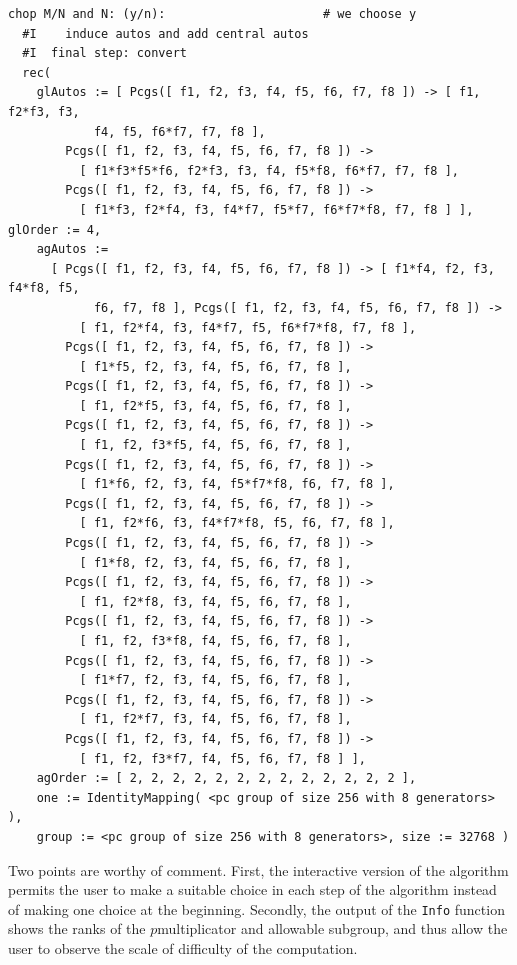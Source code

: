 \documentclass[a4paper,11pt]{report}
\begin{document}
{{\begin{Verbatim}[commandchars=!@|,fontsize=\small,frame=single,label=Example]
  chop M/N and N: (y/n):                      # we choose y
  #I    induce autos and add central autos
  #I  final step: convert
  rec(
    glAutos := [ Pcgs([ f1, f2, f3, f4, f5, f6, f7, f8 ]) -> [ f1, f2*f3, f3,
            f4, f5, f6*f7, f7, f8 ],
        Pcgs([ f1, f2, f3, f4, f5, f6, f7, f8 ]) ->
          [ f1*f3*f5*f6, f2*f3, f3, f4, f5*f8, f6*f7, f7, f8 ],
        Pcgs([ f1, f2, f3, f4, f5, f6, f7, f8 ]) ->
          [ f1*f3, f2*f4, f3, f4*f7, f5*f7, f6*f7*f8, f7, f8 ] ], glOrder := 4,
    agAutos :=
      [ Pcgs([ f1, f2, f3, f4, f5, f6, f7, f8 ]) -> [ f1*f4, f2, f3, f4*f8, f5,
            f6, f7, f8 ], Pcgs([ f1, f2, f3, f4, f5, f6, f7, f8 ]) ->
          [ f1, f2*f4, f3, f4*f7, f5, f6*f7*f8, f7, f8 ],
        Pcgs([ f1, f2, f3, f4, f5, f6, f7, f8 ]) ->
          [ f1*f5, f2, f3, f4, f5, f6, f7, f8 ],
        Pcgs([ f1, f2, f3, f4, f5, f6, f7, f8 ]) ->
          [ f1, f2*f5, f3, f4, f5, f6, f7, f8 ],
        Pcgs([ f1, f2, f3, f4, f5, f6, f7, f8 ]) ->
          [ f1, f2, f3*f5, f4, f5, f6, f7, f8 ],
        Pcgs([ f1, f2, f3, f4, f5, f6, f7, f8 ]) ->
          [ f1*f6, f2, f3, f4, f5*f7*f8, f6, f7, f8 ],
        Pcgs([ f1, f2, f3, f4, f5, f6, f7, f8 ]) ->
          [ f1, f2*f6, f3, f4*f7*f8, f5, f6, f7, f8 ],
        Pcgs([ f1, f2, f3, f4, f5, f6, f7, f8 ]) ->
          [ f1*f8, f2, f3, f4, f5, f6, f7, f8 ],
        Pcgs([ f1, f2, f3, f4, f5, f6, f7, f8 ]) ->
          [ f1, f2*f8, f3, f4, f5, f6, f7, f8 ],
        Pcgs([ f1, f2, f3, f4, f5, f6, f7, f8 ]) ->
          [ f1, f2, f3*f8, f4, f5, f6, f7, f8 ],
        Pcgs([ f1, f2, f3, f4, f5, f6, f7, f8 ]) ->
          [ f1*f7, f2, f3, f4, f5, f6, f7, f8 ],
        Pcgs([ f1, f2, f3, f4, f5, f6, f7, f8 ]) ->
          [ f1, f2*f7, f3, f4, f5, f6, f7, f8 ],
        Pcgs([ f1, f2, f3, f4, f5, f6, f7, f8 ]) ->
          [ f1, f2, f3*f7, f4, f5, f6, f7, f8 ] ],
    agOrder := [ 2, 2, 2, 2, 2, 2, 2, 2, 2, 2, 2, 2, 2 ],
    one := IdentityMapping( <pc group of size 256 with 8 generators> ),
    group := <pc group of size 256 with 8 generators>, size := 32768 )
\end{Verbatim}
 

 Two points are worthy of comment. First, the interactive version of the
algorithm permits the user to make a suitable choice in each step of the
algorithm instead of making one choice at the beginning. Secondly, the output
of the \texttt{Info} function shows the ranks of the $p$\texttt{}multiplicator and allowable subgroup, and thus allow the
user to observe the scale of difficulty of the computation. }

 }
\end{document}
